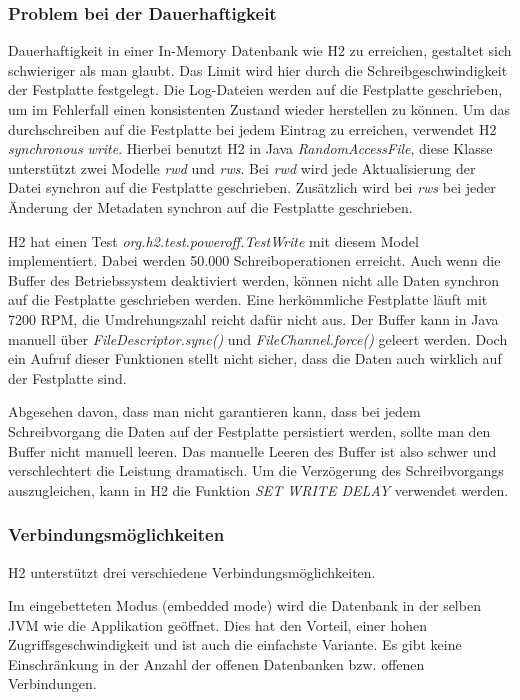 \documentclass[draft,final]{vutinfth} %
\begin{document}
\subsubsection*{Problem bei der Dauerhaftigkeit}
Dauerhaftigkeit in einer In-Memory Datenbank wie H2 zu erreichen, gestaltet sich schwieriger als man glaubt. Das Limit wird hier durch die Schreibgeschwindigkeit der Festplatte festgelegt. Die Log-Dateien werden auf die Festplatte geschrieben, um im Fehlerfall einen konsistenten Zustand wieder herstellen zu können. Um das durchschreiben auf die Festplatte bei jedem Eintrag zu erreichen, verwendet H2 \textit{synchronous write}. Hierbei benutzt H2 in Java \textit{RandomAccessFile}, diese Klasse unterstützt zwei Modelle \textit{rwd} und \textit{rws}. Bei \textit{rwd} wird jede Aktualisierung der Datei synchron auf die Festplatte geschrieben. Zusätzlich wird bei \textit{rws} bei jeder Änderung der Metadaten synchron auf die Festplatte geschrieben.

H2 hat einen Test \textit{org.h2.test.poweroff.TestWrite} mit diesem Model implementiert. Dabei werden 50.000 Schreiboperationen erreicht. Auch wenn die Buffer des Betriebssystem deaktiviert werden, können nicht alle Daten synchron auf die Festplatte geschrieben werden. Eine herkömmliche Festplatte läuft mit 7200 RPM, die Umdrehungszahl reicht dafür nicht aus. Der Buffer kann in Java manuell über \textit{FileDescriptor.sync()} und \textit{FileChannel.force()} geleert werden. Doch ein Aufruf dieser Funktionen stellt nicht sicher, dass die Daten auch wirklich auf der Festplatte sind.

Abgesehen davon, dass man nicht garantieren kann, dass bei jedem Schreibvorgang die Daten auf der Festplatte persistiert werden, sollte man den Buffer nicht manuell leeren. Das manuelle Leeren des Buffer ist also schwer und verschlechtert die Leistung dramatisch. Um die Verzögerung des Schreibvorgangs auszugleichen, kann in H2 die Funktion \textit{SET WRITE DELAY} verwendet werden.


\subsubsection*{Verbindungsmöglichkeiten}
H2 unterstützt drei verschiedene Verbindungsmöglichkeiten. 

Im eingebetteten Modus (embedded mode) wird die Datenbank in der selben JVM wie die Applikation geöffnet. Dies hat den Vorteil, einer hohen Zugriffsgeschwindigkeit und ist auch die einfachste Variante. Es gibt keine Einschränkung in der Anzahl der offenen Datenbanken bzw. offenen Verbindungen.
\end{document}
